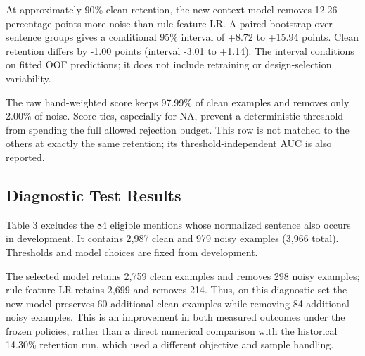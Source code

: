 \documentclass[11pt]{article}
\begin{document}
At approximately 90\% clean retention, the new context model removes 12.26 percentage points more noise than rule-feature LR. A paired bootstrap over sentence groups gives a conditional 95\% interval of +8.72 to +15.94 points. Clean retention differs by -1.00 points (interval -3.01 to +1.14). The interval conditions on fitted OOF predictions; it does not include retraining or design-selection variability.

The raw hand-weighted score keeps 97.99\% of clean examples and removes only 2.00\% of noise. Score ties, especially for NA, prevent a deterministic threshold from spending the full allowed rejection budget. This row is not matched to the others at exactly the same retention; its threshold-independent AUC is also reported.

\subsection{Diagnostic Test Results}

Table 3 excludes the 84 eligible mentions whose normalized sentence also occurs in development. It contains 2,987 clean and 979 noisy examples (3,966 total). Thresholds and model choices are fixed from development.

\begin{table}[t]\centering\small
{}
\caption{Main diagnostic results excluding development sentences.}
\end{table}

The selected model retains 2,759 clean examples and removes 298 noisy examples; rule-feature LR retains 2,699 and removes 214. Thus, on this diagnostic set the new model preserves 60 additional clean examples while removing 84 additional noisy examples. This is an improvement in both measured outcomes under the frozen policies, rather than a direct numerical comparison with the historical 14.30\% retention run, which used a different objective and sample handling.
\end{document}
